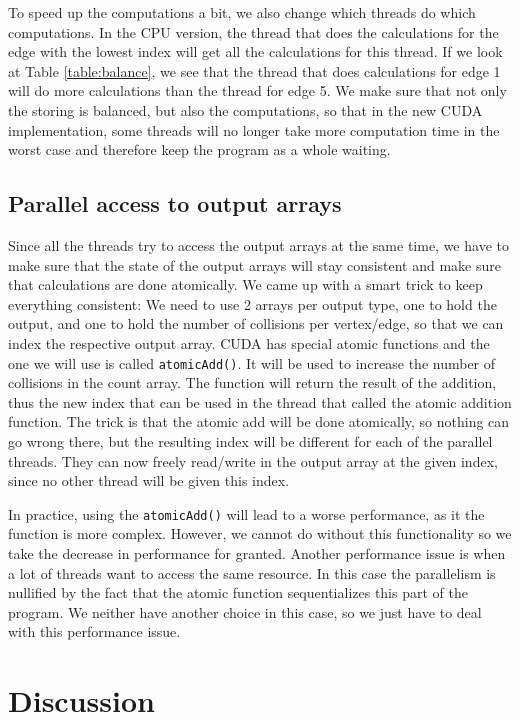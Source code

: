 To speed up the computations a bit, we also change which threads do which computations. In the CPU version, the thread that does the calculations for the edge with the lowest index will get all the calculations for this thread. If we look at Table \ref{table:balance}, we see that the thread that does calculations for edge 1 will do more calculations than the thread for edge 5. We make sure that not only the storing is balanced, but also the computations, so that in the new CUDA implementation, some threads will no longer take more computation time in the worst case and therefore keep the program as a whole waiting.

\subsection{Parallel access to output arrays}
Since all the threads try to access the output arrays at the same time, we have to make sure that the state of the output arrays will stay consistent and make sure that calculations are done atomically. We came up with a smart trick to keep everything consistent: We need to use 2 arrays per output type, one to hold the output, and one to hold the number of collisions per vertex/edge, so that we can index the respective output array. CUDA has special atomic functions and the one we will use is called \texttt{atomicAdd()}. It will be used to increase the number of collisions in the count array. The function will return the result of the addition, thus the new index that can be used in the thread that called the atomic addition function. The trick is that the atomic add will be done atomically, so nothing can go wrong there, but the resulting index will be different for each of the parallel threads. They can now freely read/write in the output array at the given index, since no other thread will be given this index.

In practice, using the \texttt{atomicAdd()} will lead to a worse performance, as it the function is more complex. However, we cannot do without this functionality so we take the decrease in performance for granted. Another performance issue is when a lot of threads want to access the same resource. In this case the parallelism is nullified by the fact that the atomic function sequentializes this part of the program. We neither have another choice in this case, so we just have to deal with this performance issue. 

\section{Discussion}
